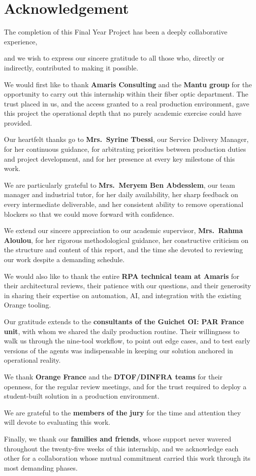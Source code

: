 \chapter*{Acknowledgement}
\thispagestyle{MyStyle}

The completion of this Final Year Project has been a deeply collaborative experience,%

and we wish to express our sincere gratitude to all those who, directly or indirectly,
contributed to making it possible.

We would first like to thank \textbf{Amaris Consulting} and the \textbf{Mantu group}
for the opportunity to carry out this internship within their fiber optic department.
The trust placed in us, and the access granted to a real production environment, gave
this project the operational depth that no purely academic exercise could have
provided.

Our heartfelt thanks go to \textbf{Mrs.\ Syrine Tbessi}, our Service Delivery
Manager, for her continuous guidance, for arbitrating priorities between production
duties and project development, and for her presence at every key milestone of this
work.

We are particularly grateful to \textbf{Mrs.\ Meryem Ben Abdesslem}, our team
manager and industrial tutor, for her daily availability, her sharp feedback on every
intermediate deliverable, and her consistent ability to remove operational blockers so
that we could move forward with confidence.

We extend our sincere appreciation to our academic supervisor,
\textbf{Mrs.\ Rahma Aloulou}, for her rigorous methodological guidance, her
constructive criticism on the structure and content of this report, and the time she
devoted to reviewing our work despite a demanding schedule.

We would also like to thank the entire \textbf{RPA technical team at Amaris} for
their architectural reviews, their patience with our questions, and their generosity in
sharing their expertise on automation, AI, and integration with the existing Orange
tooling.

Our gratitude extends to the \textbf{consultants of the Guichet OI: PAR France unit},
with whom we shared the daily production routine. Their willingness to walk us through
the nine-tool workflow, to point out edge cases, and to test early versions of the
agents was indispensable in keeping our solution anchored in operational reality.

We thank \textbf{Orange France} and the \textbf{DTOF/DINFRA teams} for their
openness, for the regular review meetings, and for the trust required to deploy a
student-built solution in a production environment.

We are grateful to the \textbf{members of the jury} for the time and attention they
will devote to evaluating this work.

Finally, we thank our \textbf{families and friends}, whose support never wavered
throughout the twenty-five weeks of this internship, and we acknowledge each other for a
collaboration whose mutual commitment carried this work through its most demanding
phases.
